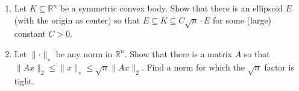 \documentclass[11pt,a4paper]{article}
\renewcommand{\leq}{\leqslant}
\DeclareMathOperator{\conv}{conv}
\DeclareMathOperator{\cone}{cone}
\begin{document}
\begin{enumerate}
\item Let $K ⊆\mathbb{R}^n$ be a symmetric convex body. Show that there is an ellipsoid $E$ (with the origin as center) so that $E ⊆ K ⊆ C\sqrt{n}\cdot E$ for some (large) constant $C >0$.


\item Let $∥\cdot∥_∗$ be any norm in $\mathbb{R}^n$. Show that there is a matrix $A$ so that $∥Ax∥_2 \leq ∥x∥_∗ \leq \sqrt{n}∥Ax∥_2$.
Find a norm for which the $\sqrt{n}$ factor is tight. 


\end{enumerate}


%
%


 
\end{document}
